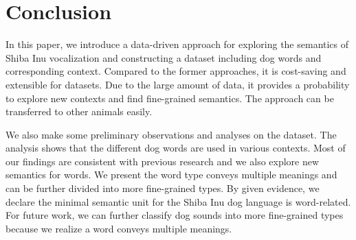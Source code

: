 \section{Conclusion}
In this paper, we introduce a data-driven approach for exploring the semantics of Shiba Inu vocalization and constructing a dataset including dog words and corresponding context. Compared to the former approaches, it is cost-saving and extensible for datasets. Due to the large amount of data, it provides a probability to explore new contexts and find fine-grained semantics. The approach can be transferred to other animals easily. 

We also make some preliminary observations and analyses on the dataset. The analysis shows that the different dog words are used in various contexts. Most of our findings are consistent with previous research and we also explore new semantics for words. We present the word type conveys multiple meanings and can be further divided into more fine-grained types. By given evidence, we declare the minimal semantic unit for the Shiba Inu dog language is word-related. For future work, we can further classify dog sounds into more fine-grained types because we realize a word conveys multiple meanings. 
